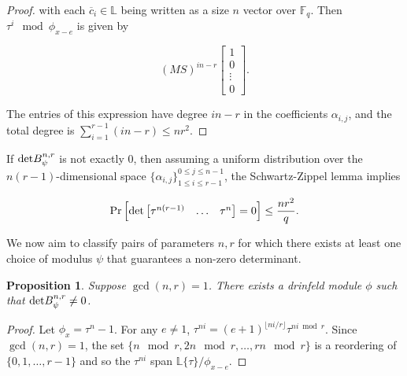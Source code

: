 \documentclass[sigconf]{acmart}
\newtheorem{prop}{Proposition}
\renewcommand{\L}{\mathbb{L}}
\begin{document}
\begin{proof}
with each $\overline{c}_i \in \L$ being written as a size $n$ vector over $\mathbb{F}_q$. Then $\tau^{i} \mod \phi_{x-e}$ is given by 

\begin{equation*}
(MS)^{in-r} \begin{bmatrix} 1 \\ 0 \\ \vdots \\ 0 \end{bmatrix}.
\end{equation*}

The entries of this expression have degree $in - r$ in the coefficients $\alpha_{i,j}$, and the total degree is $\sum_{i=1}^{r-1} (in - r) \leq nr^2$.

\end{proof}

If $\textnormal{det} B_{\psi}^{n,r} $ is not exactly 0, then assuming a uniform distribution over the $n(r-1)$-dimensional space $\{\alpha_{i,j}\}_{1 \leq i \leq r-1}^{0 \leq j \leq n-1}$, the Schwartz-Zippel lemma implies

\begin{equation*}
    \Pr\Big[\textnormal{det} \begin{bmatrix} \tau^{n(r-1)} & \ldots & \tau^{n} \end{bmatrix} = 0\Big] \leq \frac{nr^2}{q}.
\end{equation*}

We now aim to classify pairs of parameters $n,r$ for which there exists at least one choice of modulus $\psi$ that guarantees a non-zero determinant. 

\begin{prop}
Suppose $\gcd(n,r) = 1$. There exists a drinfeld module $\phi$ such that $\textnormal{det} B_{\psi}^{n,r} \neq 0$.  %
\end{prop}
\begin{proof}
Let $\phi_x = \tau^n - 1$. For any $e \neq 1$, $\tau^{ni} = (e + 1)^{\lfloor ni/r \rfloor} \tau^{ni \bmod r}$. Since $\gcd(n,r) = 1$, the set $\{ n \mod r, 2n \mod r, \ldots, rn \mod r\}$ is a reordering of $\{0, 1, \ldots, r-1\}$ and so the $\tau^{ni}$ span $\L\{ \tau\}/\phi_{x - e}$.
\end{proof}
\end{document}
